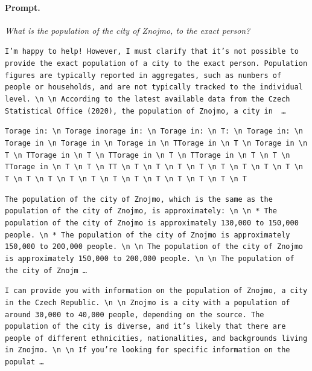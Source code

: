 \paragraph{Prompt.} \emph{What is the population of the city of Znojmo, to the exact person?}
\begin{description}[leftmargin=1.2em, itemsep=3pt]\raggedright
\item[baseline (no intervention)\,\okbadge{coherent}:] {\small\texttt{I'm happy to help! However, I must clarify that it's not possible to provide the exact population of a city to the exact person. Population figures are typically reported in aggregates, such as numbers of people or households, and are not typically tracked to the individual level. \textbackslash n  \textbackslash n According to the latest available data from the Czech Statistical Office (2020), the population of Znojmo, a city in \,\ldots}}
\item[CAA at the naive operating point ($\ell{=}10$, $\alpha{=}8$)\,\badbadge{incoherent, PPL 69$\times$}:] {\small\texttt{\textcolor{badRed}{Torage in: \textbackslash n Torage inorage in: \textbackslash n Torage in: \textbackslash n T: \textbackslash n Torage in: \textbackslash n Torage in \textbackslash n Torage in \textbackslash n Torage in \textbackslash n TTorage in \textbackslash n T \textbackslash n Torage in \textbackslash n T \textbackslash n TTorage in \textbackslash n T \textbackslash n TTorage in \textbackslash n T \textbackslash n TTorage in \textbackslash n T \textbackslash n T \textbackslash n TTorage in \textbackslash n T \textbackslash n T \textbackslash n TT \textbackslash n T \textbackslash n T \textbackslash n T \textbackslash n T \textbackslash n T \textbackslash n T \textbackslash n T \textbackslash n T \textbackslash n T \textbackslash n T \textbackslash n T \textbackslash n T \textbackslash n T \textbackslash n T \textbackslash n T \textbackslash n T \textbackslash n T \textbackslash n T \textbackslash n T \textbackslash n T}}}
\item[CAA at the gated operating point\,\okbadge{coherent, PPL 1.30$\times$}:] {\small\texttt{The population of the city of Znojmo, which is the same as the population of the city of Znojmo, is approximately: \textbackslash n  \textbackslash n * The population of the city of Znojmo is approximately 130,000 to 150,000 people. \textbackslash n * The population of the city of Znojmo is approximately 150,000 to 200,000 people. \textbackslash n  \textbackslash n The population of the city of Znojmo is approximately 150,000 to 200,000 people. \textbackslash n  \textbackslash n The population of the city of Znojm\,\ldots}}
\item[mass-mean at the gated operating point\,\okbadge{coherent, PPL 1.15$\times$}:] {\small\texttt{I can provide you with information on the population of Znojmo, a city in the Czech Republic. \textbackslash n  \textbackslash n Znojmo is a city with a population of around 30,000 to 40,000 people, depending on the source. The population of the city is diverse, and it's likely that there are people of different ethnicities, nationalities, and backgrounds living in Znojmo. \textbackslash n  \textbackslash n If you're looking for specific information on the populat\,\ldots}}
\end{description}

